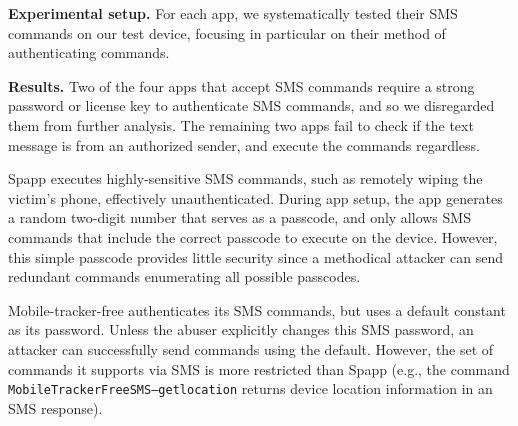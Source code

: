\documentclass[sigconf,balance=false]{acmart}
\newcommand{\sumanth}[1]{\textcolor{violet}{\noindent[SR: #1]}}
\newcommand{\grant}[1]{\textsf{\textcolor{teal}{[GH: #1]}}}
\newcommand{\geoff}[1]{\textcolor{purple}{\noindent[GV: #1]}}
\newcommand{\sumanth}[1]{}
\newcommand{\grant}[1]{}
\newcommand{\geoff}[1]{}
\begin{document}
\textbf{Experimental setup.}
For each app, we systematically tested their SMS commands on our test
device, focusing in particular on their method of authenticating commands. 

\textbf{Results.}  Two of the four apps that accept SMS commands
require a strong password or license key to authenticate SMS commands,
and so we disregarded them from further analysis.
The remaining two apps fail to check if the text message is from an
authorized sender, and execute the commands regardless.




Spapp executes highly-sensitive SMS commands, such as remotely wiping
the victim's phone, effectively unauthenticated.  During app setup,
the app generates a random two-digit number that serves as a passcode,
and only allows SMS commands that include the correct passcode to
execute on the device.  However, this simple passcode provides little
security since a methodical attacker can send redundant commands
enumerating all possible passcodes.

Mobile-tracker-free authenticates its SMS commands, but uses a default
constant as its password.  Unless the abuser explicitly changes this
SMS password, an attacker can successfully send commands using the
default.  However, the set of commands it supports via SMS is more
restricted than Spapp (e.g., the
command \texttt{MobileTrackerFreeSMS--getlocation}
returns device location information in an SMS response).
\end{document}

